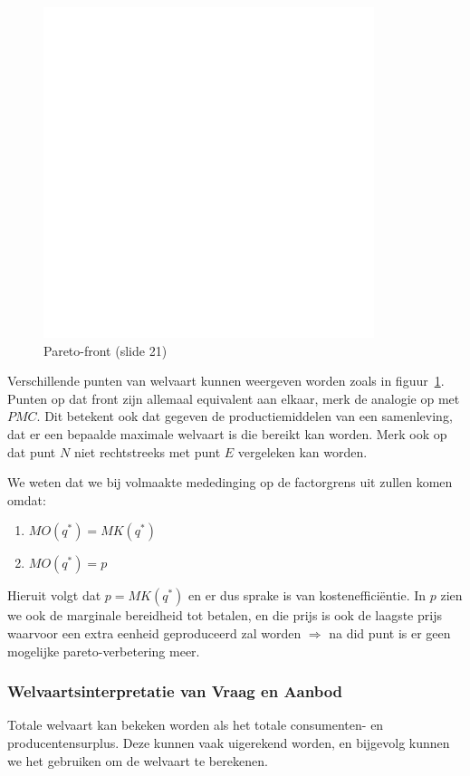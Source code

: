 \begin{figure}[htbp]
   \centering
   \includegraphics[scale=0.4]{Images/white.png}
   \caption{Pareto-front (slide 21)}
   \label{fig:paretofront}
\end{figure}
Verschillende punten van welvaart kunnen weergeven worden zoals in figuur~\ref{fig:paretofront}. Punten op dat front zijn allemaal equivalent aan elkaar, merk de analogie op met $PMC$. Dit betekent ook dat gegeven de productiemiddelen van een samenleving, dat er een bepaalde maximale welvaart is die bereikt kan worden. Merk ook op dat punt $N$ niet rechtstreeks met punt $E$ vergeleken kan worden.

We weten dat we bij volmaakte mededinging op de factorgrens uit zullen komen omdat:
\begin{enumerate}
   \item $MO(q^*) = MK(q^*)$
   \item $MO(q^*) = p$
\end{enumerate}
Hieruit volgt dat $p = MK(q^*)$ en er dus sprake is van kosteneffici\"entie. In $p$ zien we ook de marginale bereidheid tot betalen, en die prijs is ook de laagste prijs waarvoor een extra eenheid geproduceerd zal worden $\Rightarrow$ na did punt is er geen mogelijke pareto-verbetering meer.
\subsubsection{Welvaartsinterpretatie van Vraag en Aanbod}
Totale welvaart kan bekeken worden als het totale consumenten- en producentensurplus. Deze kunnen vaak uigerekend worden, en bijgevolg kunnen we het gebruiken om de welvaart te berekenen.

